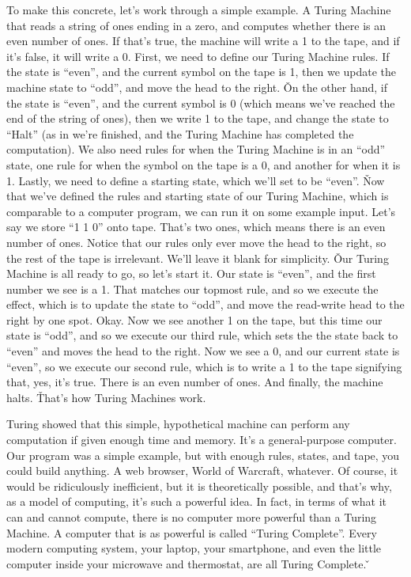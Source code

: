 \be
To make this concrete, let's work through a simple example. A Turing Machine that reads a string of ones ending in a
zero, and computes whether there is an even number of ones. If that's true, the machine will write a 1 to the tape,
and if it's false, it will write a 0. First, we need to define our Turing Machine rules. If the state is ``even'', and
the current symbol on the tape is 1, then we update the machine state to ``odd'', and move the head to the right. \v

On the other hand, if the state is ``even'', and the current symbol is 0 (which means we've reached the end of the
string of ones), then we write 1 to the tape, and change the state to ``Halt'' (as in we're finished, and the Turing
Machine has completed the computation). We also need rules for when the Turing Machine is in an ``odd'' state, one rule
for when the symbol on the tape is a 0, and another for when it is 1. Lastly, we need to define a starting state,
which we'll set to be ``even''. \v

Now that we've defined the rules and starting state of our Turing Machine, which is comparable to a computer program,
we can run it on some example input. Let's say we store ``1 1 0'' onto tape. That's two ones, which means there is an
even number of ones. Notice that our rules only ever move the head to the right, so the rest of the tape is
irrelevant. We'll leave it blank for simplicity. \v

Our Turing Machine is all ready to go, so let's start it. Our state is ``even'', and the first number we see is a 1.
That matches our topmost rule, and so we execute the effect, which is to update the state to ``odd'', and move the
read-write head to the right by one spot. Okay. Now we see another 1 on the tape, but this time our state is ``odd'',
and so we execute our third rule, which sets the the state back to ``even'' and moves the head to the right. Now we
see a 0, and our current state is ``even'', so we execute our second rule, which is to write a 1 to the tape signifying
that, yes, it's true. There is an even number of ones. And finally, the machine halts. \v

That's how Turing Machines work.
\ee

Turing showed that this simple, hypothetical machine can perform any computation if given enough time and memory.
It's a general-purpose computer. Our program was a simple example, but with enough rules, states, and tape, you could
build anything. A web browser, World of Warcraft, whatever. Of course, it would be ridiculously inefficient, but it
is theoretically possible, and that's why, as a model of computing, it's such a powerful idea. In fact, in terms of
what it can and cannot compute, there is no computer more powerful than a Turing Machine. A computer that is as
powerful is called ``Turing Complete''. Every modern computing system, your laptop, your smartphone, and even the
little computer inside your microwave and thermostat, are all Turing Complete. \v

